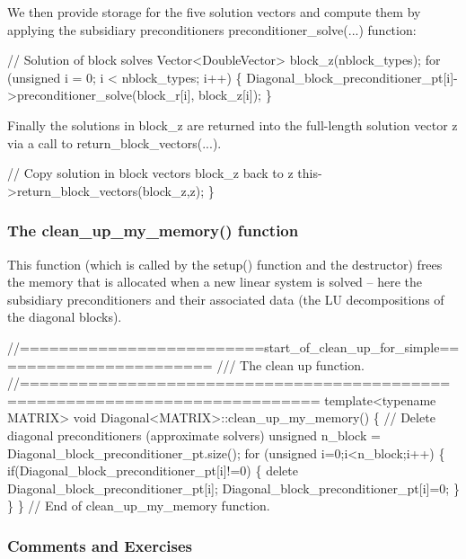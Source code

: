 We then provide storage for the five solution vectors and compute them by applying the subsidiary preconditioners\textquotesingle{} {\ttfamily preconditioner\+\_\+solve}(...) function\+:


\begin{DoxyCodeInclude}
  \textcolor{comment}{// Solution of block solves}
  Vector<DoubleVector> block\_z(nblock\_types);
  \textcolor{keywordflow}{for} (\textcolor{keywordtype}{unsigned} i = 0; i < nblock\_types; i++)
   \{
    Diagonal\_block\_preconditioner\_pt[i]->preconditioner\_solve(block\_r[i],
                                                              block\_z[i]);
   \}

\end{DoxyCodeInclude}


Finally the solutions in {\ttfamily block\+\_\+z} are returned into the full-\/length solution vector {\ttfamily z} via a call to {\ttfamily return\+\_\+block\+\_\+vectors}(...).


\begin{DoxyCodeInclude}
  \textcolor{comment}{// Copy solution in block vectors block\_z back to z}
  this->return\_block\_vectors(block\_z,z);
 \}

\end{DoxyCodeInclude}
\hypertarget{index_diag_clean}{}\subsubsection{The clean\+\_\+up\+\_\+my\+\_\+memory() function}\label{index_diag_clean}
This function (which is called by the {\ttfamily setup()} function and the destructor) frees the memory that is allocated when a new linear system is solved -- here the subsidiary preconditioners and their associated data (the LU decompositions of the diagonal blocks).


\begin{DoxyCodeInclude}
 \textcolor{comment}{//=========================start\_of\_clean\_up\_for\_simple=======================}\textcolor{comment}{}
\textcolor{comment}{ /// The clean up function.}
\textcolor{comment}{} \textcolor{comment}{//============================================================================}
 \textcolor{keyword}{template}<\textcolor{keyword}{typename} MATRIX> 
 \textcolor{keywordtype}{void} Diagonal<MATRIX>::clean\_up\_my\_memory()
 \{ 
  \textcolor{comment}{// Delete diagonal preconditioners (approximate solvers)}
  \textcolor{keywordtype}{unsigned} n\_block = Diagonal\_block\_preconditioner\_pt.size();
  \textcolor{keywordflow}{for} (\textcolor{keywordtype}{unsigned} i=0;i<n\_block;i++)
   \{
    \textcolor{keywordflow}{if}(Diagonal\_block\_preconditioner\_pt[i]!=0)
     \{
      \textcolor{keyword}{delete} Diagonal\_block\_preconditioner\_pt[i];
      Diagonal\_block\_preconditioner\_pt[i]=0;
     \}
   \}
 \} \textcolor{comment}{// End of clean\_up\_my\_memory function.}

\end{DoxyCodeInclude}
\hypertarget{index_diag_comments}{}\subsubsection{Comments and Exercises}\label{index_diag_comments}

